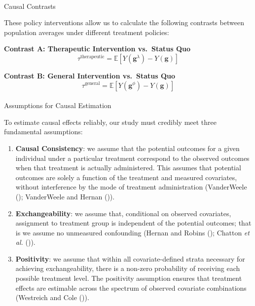\documentclass[
  single column]{article}
\makeatletter
\let\oldparagraph\paragraph
\renewcommand{\paragraph}{
    \@ifstar
      \xxxParagraphStar
      \xxxParagraphNoStar
  }
\newcommand{\xxxParagraphStar}[1]{\oldparagraph*{#1}\mbox{}}
\newcommand{\xxxParagraphNoStar}[1]{\oldparagraph{#1}\mbox{}}
\makeatother
\begin{document}
\paragraph{Causal Contrasts}\label{causal-contrasts}

These policy interventions allow us to calculate the following contrasts
between population averages under different treatment policies:

\textbf{Contrast A: Therapeutic Intervention vs.~Status Quo} \[
   \tau^{\text{therapeutic}} = \mathbb{E}[Y(\mathbf{g}^\lambda) - Y(\mathbf{g})]
   \]

\textbf{Contrast B: General Intervention vs.~Status Quo} \[
   \tau^{\text{general}} = \mathbb{E}[Y(\mathbf{g}^\phi) - Y(\mathbf{g})]
   \]

\paragraph{Assumptions for Causal
Estimation}\label{assumptions-for-causal-estimation}

To estimate causal effects reliably, our study must credibly meet three
fundamental assumptions:

\begin{enumerate}
\def\labelenumi{\arabic{enumi}.}
\item
  \textbf{Causal Consistency}: we assume that the potential outcomes for
  a given individual under a particular treatment correspond to the
  observed outcomes when that treatment is actually administered. This
  assumes that potential outcomes are solely a function of the treatment
  and measured covariates, without interference by the mode of treatment
  administration (VanderWeele ();
  VanderWeele and Hernan ()).
\item
  \textbf{Exchangeability}: we assume that, conditional on observed
  covariates, assignment to treatment group is independent of the
  potential outcomes; that is we assume no unmeasured confounding
  (Hernan and Robins (); Chatton
  \emph{et al.} ()).
\item
  \textbf{Positivity}: we assume that within all covariate-defined
  strata necessary for achieving exchangeability, there is a non-zero
  probability of receiving each possible treatment level. The positivity
  assumption ensures that treatment effects are estimable across the
  spectrum of observed covariate combinations (Westreich and Cole
  ()).
\end{enumerate}
\end{document}
